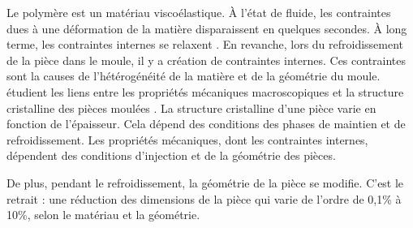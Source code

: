 Le polymère est un matériau viscoélastique.
À l'état de fluide, les contraintes dues à une déformation de la matière disparaissent en quelques secondes.
À long terme, les contraintes internes se relaxent \cite{giroud_mesure_2001}.
En revanche, lors du refroidissement de la pièce dans le moule, il y a création de contraintes internes.
Ces contraintes sont la causes de l'hétérogénéité de la matière et de la géométrie du moule.
\citeauthor{galeski_nano_2009} étudient les liens entre les propriétés mécaniques macroscopiques et la structure cristalline des pièces moulées \cite{galeski_nano_2009}.
La structure cristalline d'une pièce varie en fonction de l'épaisseur.
Cela dépend des conditions des phases de maintien et de refroidissement.
Les propriétés mécaniques, dont les contraintes internes, dépendent des conditions d'injection et de la géométrie des pièces.

De plus, pendant le refroidissement, la géométrie de la pièce se modifie. C'est le retrait : une réduction des dimensions de la pièce qui varie de l'ordre de 0,1\% à 10\%, selon le matériau et la géométrie.


